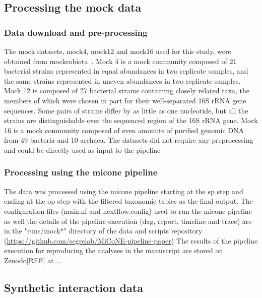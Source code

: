   \subsection*{Processing the mock data}

    \subsubsection*{Data download and pre-processing}
    The mock datasets, mock4, mock12 and mock16 used for this study, were obtained from mockrobiota~\cite{Bokulich2016}.
    Mock 4 is a mock community composed of 21 bacterial strains represented in equal abundances in two replicate samples, and the same strains represented in uneven abundances in two replicate samples.
    Mock 12 is composed of 27 bacterial strains containing closely related taxa, the members of which were chosen in part for their well-separated 16S rRNA gene sequences. Some pairs of strains differ by as little as one nucleotide, but all the strains are distinguishable over the sequenced region of the 16S rRNA gene.
    Mock 16 is a mock community composed of even amounts of purified genomic DNA from 49 bacteria and 10 archaea.
    The datasets did not require any preprocessing and could be directly used as input to the pipeline

    \subsubsection*{Processing using the \ac{micone} pipeline}
    The data was processed using the \ac{micone} pipeline starting at the \ac{sp} step and ending at the \ac{op} step with the filtered taxonomic tables as the final output.
    The configuration files (main.nf and nextflow.config) used to run the \ac{micone} pipeline as well the details of the pipeline execution (dag, report, timeline and trace) are in the "runs/mock*" directory of the data and scripts repository (\href{https://github.com/segrelab/MiCoNE-pipeline-paper}{https://github.com/segrelab/MiCoNE-pipeline-paper})
    The results of the pipeline execution for reproducing the analyses in the manuscript are stored on Zenodo[REF] at ...

  \subsection*{Synthetic interaction data}

